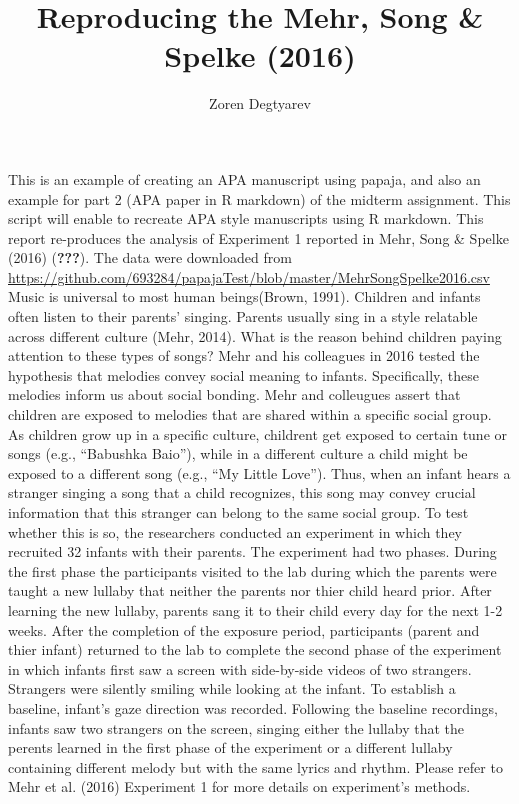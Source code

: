 \documentclass[man]{apa6}
\title{Reproducing the Mehr, Song \& Spelke (2016)}
\author{Zoren Degtyarev}
\date{}
\affiliation{
\vspace{0.5cm}
 Brooklyn College of the City University of New York}
\begin{document}
\maketitle

This is an example of creating an APA manuscript using papaja, and also
an example for part 2 (APA paper in R markdown) of the midterm
assignment. This script will enable to recreate APA style manuscripts
using R markdown. This report re-produces the analysis of Experiment 1
reported in Mehr, Song \& Spelke (2016) ({\textbf{???}}). The data were
downloaded from
\url{https://github.com/693284/papajaTest/blob/master/MehrSongSpelke2016.csv}
Music is universal to most human beings(Brown, 1991). Children and
infants often listen to their parents' singing. Parents usually sing in
a style relatable across different culture (Mehr, 2014). What is the
reason behind children paying attention to these types of songs? Mehr
and his colleagues in 2016 tested the hypothesis that melodies convey
social meaning to infants. Specifically, these melodies inform us about
social bonding. Mehr and colleugues assert that children are exposed to
melodies that are shared within a specific social group. As children
grow up in a specific culture, childrent get exposed to certain tune or
songs (e.g., \enquote{Babushka Baio}), while in a different culture a
child might be exposed to a different song (e.g., \enquote{My Little
Love}). Thus, when an infant hears a stranger singing a song that a
child recognizes, this song may convey crucial information that this
stranger can belong to the same social group. To test whether this is
so, the researchers conducted an experiment in which they recruited 32
infants with their parents. The experiment had two phases. During the
first phase the participants visited to the lab during which the parents
were taught a new lullaby that neither the parents nor thier child heard
prior. After learning the new lullaby, parents sang it to their child
every day for the next 1-2 weeks. After the completion of the exposure
period, participants (parent and thier infant) returned to the lab to
complete the second phase of the experiment in which infants first saw a
screen with side-by-side videos of two strangers. Strangers were
silently smiling while looking at the infant. To establish a baseline,
infant's gaze direction was recorded. Following the baseline recordings,
infants saw two strangers on the screen, singing either the lullaby that
the perents learned in the first phase of the experiment or a different
lullaby containing different melody but with the same lyrics and rhythm.
Please refer to Mehr et al. (2016) Experiment 1 for more details on
experiment's methods.
\end{document}
